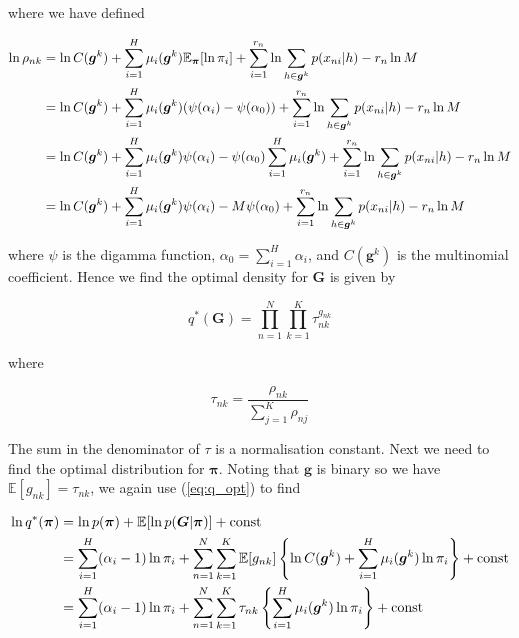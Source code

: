\documentclass{article}
\begin{document}
where we have defined

\begin{align}
    \ln \rho_{nk} &= \ln C(\boldsymbol{g}^k) + \sum_{i = 1}^H \mu_i(\boldsymbol{g}^k) \mathbb{E}_{\boldsymbol{\pi}}[\ln \pi_i] + \sum_{i = 1}^{r_n} \ln \sum_{h \in \boldsymbol{g}^k} p(x_{ni} | h) - r_n \ln M \notag \\
    &= \ln C(\boldsymbol{g}^k) + \sum_{i = 1}^H \mu_i(\boldsymbol{g}^k) (\psi(\alpha_i) - \psi(\alpha_0)) + \sum_{i = 1}^{r_n} \ln \sum_{h \in \boldsymbol{g}^k} p(x_{ni} | h) - r_n \ln M \notag \\
    &= \ln C(\boldsymbol{g}^k) + \sum_{i = 1}^H \mu_i(\boldsymbol{g}^k) \psi(\alpha_i) - \psi(\alpha_0)\sum_{i = 1}^H \mu_i(\boldsymbol{g}^k) + \sum_{i = 1}^{r_n} \ln \sum_{h \in \boldsymbol{g}^k} p(x_{ni} | h) - r_n \ln M\notag\\
    &= \ln C(\boldsymbol{g}^k) + \sum_{i = 1}^H \mu_i(\boldsymbol{g}^k) \psi(\alpha_i) - M\psi(\alpha_0) + \sum_{i = 1}^{r_n} \ln \sum_{h \in \boldsymbol{g}^k} p(x_{ni} | h) - r_n \ln M
\end{align}

where $\psi$ is the digamma function, $\alpha_0 = \sum_{i = 1}^H \alpha_i$, and $C(\boldsymbol{g}^k)$ is the multinomial coefficient. Hence we find the optimal density for $\boldsymbol{G}$ is given by

\begin{equation}
q^*(\boldsymbol{G}) = \prod_{n = 1}^N \prod_{k = 1}^K \tau_{nk}^{g_{nk}}
\end{equation}

where

\begin{equation}
\label{eq:sg_pp}
\tau_{nk} = \frac{\rho_{nk}}{\sum_{j = 1}^K \rho_{nj}}
\end{equation}

The sum in the denominator of $\tau$ is a normalisation constant. Next we need to find the optimal distribution for $\boldsymbol{\pi}$. Noting that $\boldsymbol{g}$ is binary so we have $ \mathbb{E}[g_{nk}] = \tau_{nk}$, we again use (\ref{eq:q_opt}) to find

\begin{align}
    \ln q^*(\boldsymbol{\pi}) &= \ln p(\boldsymbol{\pi}) + \mathbb{E}[\ln p(\boldsymbol{G} | \boldsymbol{\pi})] + \text{const}\notag\\
    &= \sum_{i = 1}^H (\alpha_i - 1) \ln \pi_i + \sum_{n = 1}^N \sum_{k = 1}^K \mathbb{E}[g_{nk}]\left\{ \ln C(\boldsymbol{g}^k) + \sum_{i = 1}^H \mu_i(\boldsymbol{g}^k) \ln \pi_i \right\} + \text{const} \notag\\
    &= \sum_{i = 1}^H (\alpha_i - 1) \ln \pi_i + \sum_{n = 1}^N \sum_{k = 1}^K \tau_{nk} \left\{ \sum_{i = 1}^H \mu_i(\boldsymbol{g}^k) \ln \pi_i \right\} + \text{const}
\end{align}
\end{document}
